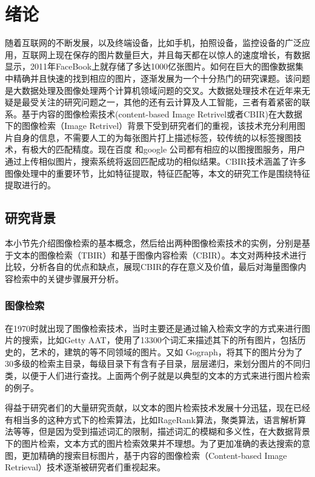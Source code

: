﻿\chapter{绪论}

随着互联网的不断发展，以及终端设备，比如手机，拍照设备，监控设备的广泛应用，互联网上现在保存的图片数量巨大，并且每天都在以惊人的速度增长，有数据显示，2011年FaceBook上就存储了多达1000亿张图片。如何在巨大的图像数据集中精确并且快速的找到相应的图片，逐渐发展为一个十分热门的研究课题。该问题是大数据处理及图像处理两个计算机领域问题的交叉。大数据处理技术在近年来无疑是最受关注的研究问题之一，其他的还有云计算及人工智能，三者有着紧密的联系。基于内容的图像检索技术(content-based Image Retrivel或者CBIR)在大数据下的图像检索（Image Retrivel）背景下受到研究者们的重视，该技术充分利用图片自身的信息，不需要人工的为每张图片打上描述标签，较传统的以标签搜图技术，有极大的匹配精度。现在百度 和google 公司都有相应的以图搜图服务，用户通过上传相似图片，搜索系统将返回匹配成功的相似结果。CBIR技术涵盖了许多图像处理中的重要环节，比如特征提取，特征匹配等，本文的研究工作是围绕特征提取进行的。

\section{研究背景}
本小节先介绍图像检索的基本概念，然后给出两种图像检索技术的实例，分别是基于文本的图像检索（TBIR）和基于图像内容检索（CBIR）。本文对两种技术进行比较，分析各自的优点和缺点，展现CBIR的存在意义及价值，最后对海量图像内容检索中的关键步骤展开分析。

\subsection{图像检索}
在1970时就出现了图像检索技术，当时主要还是通过输入检索文字的方式来进行图片的搜索，比如Getty AAT，使用了13300个词汇来描述其下的所有图片，包括历史的，艺术的，建筑的等不同领域的图片。又如 Gograph，将其下的图片分为了30多级的检索主目录，每级目录下有含有子目录，层层递归，来划分图片的不同归类，以便于人们进行查找。上面两个例子就是以典型的文本的方式来进行图片检索的例子。

得益于研究者们的大量研究贡献，以文本的图片检索技术发展十分迅猛，现在已经有相当多的这种方式下的检索算法，比如RageRank算法，聚类算法，语言解析算法等等，但是因为受到描述词汇的限制，描述词汇的模糊和多义性，在大数据背景下的图片检索，文本方式的图片检索效果并不理想。为了更加准确的表达搜索的意图，更加精确的搜索目标图片，基于内容的图像检索（Content-based Image Retrieval）技术逐渐被研究者们重视起来。


